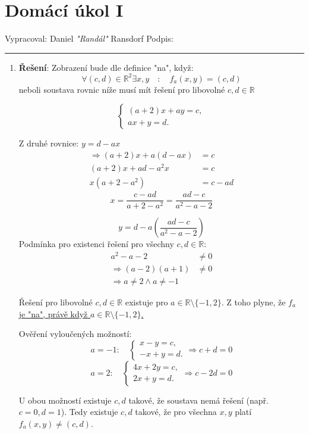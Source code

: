 \documentclass[12pt]{article}
\begin{document}
\section*{Domácí úkol I}

Vypracoval: Daniel \textit{"Randál"} Ransdorf \hfill Podpis: \rule{4cm}{0.4pt}

\begin{enumerate}
  \item \textbf{Řešení}:
    Zobrazení bude dle definice "na", když:
    \[
      \forall (c,d) \in \mathbb{R}^2 \exists x,y \quad : \quad f_a(x,y) = (c,d)
    \]
    neboli soustava rovnic níže musí mít řešení pro libovolné $c,d \in \mathbb{R}$
    
    \[
    \begin{cases}
    (a+2)x + ay = c,\\
    ax + y = d.
    \end{cases}
    \]

    Z druhé rovnice: $y = d - ax$
    \begin{align*}
    \Rightarrow (a+2)x + a(d - ax) &= c \\
    (a+2)x + ad - a^2x &= c \\
    x(a+2 - a^2) &= c - ad
    \end{align*}
    \[
    x = \dfrac{c - ad}{a+2 - a^2} = \dfrac{ad - c}{a^2 - a - 2}
    \]

    \[
    y = d - a\left(\dfrac{ad - c}{a^2 - a - 2}\right)
    \]
    Podmínka pro existenci řešení pro všechny $c,d \in \mathbb{R}$:
    \begin{align*}
    a^2 - a - 2 &\ne 0 \\
    \Rightarrow (a-2)(a+1) &\ne 0 \\
    \Rightarrow a \ne 2 \land a \ne -1
    \end{align*}

    Řešení pro libovolné $c,d \in \mathbb{R}$ existuje pro $a \in \mathbb{R} \setminus \{-1,2\}$.
    Z toho plyne, že \underline{$f_a$ je "na", právě když $a \in \mathbb{R} \setminus \{-1,2\}$.}
    
    Ověření vyloučených možností:
    \[
      a=-1: \quad
      \begin{cases}
      x - y = c,\\
      -x + y = d.
      \end{cases}
      \Rightarrow c + d = 0
    \]
    \[
      a=2: \quad
      \begin{cases}
      4x + 2y = c,\\
      2x + y = d.
      \end{cases}
      \Rightarrow c - 2d = 0
    \]

    U obou možností existuje $c,d$ takové, že soustava nemá řešení (např. $c=0,d=1$). Tedy existuje $c,d$ takové, že pro všechna $x,y$ platí $f_a(x,y) \ne (c,d)$.
\end{enumerate}
\end{document}
